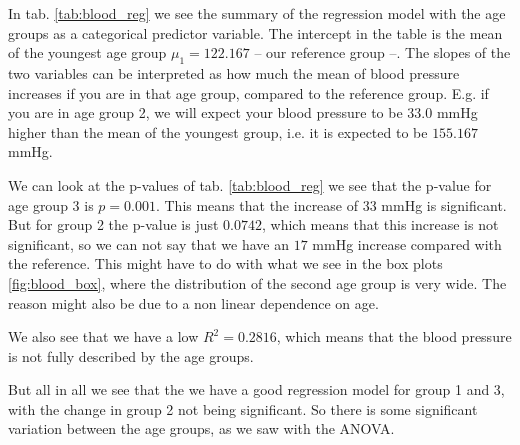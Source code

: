 \documentclass[a4paper,norsk, 10pt]{article}
\begin{document}
In tab. \ref{tab:blood_reg} we see the summary of the regression model with the age groups as a categorical predictor variable. The intercept in the table is the mean of the youngest age group $\mu_1 = 122.167$ --  our reference group --. The slopes of the two variables can be interpreted as how much the mean of blood pressure increases if you are in that age group, compared to the reference group. E.g. if you are in age group 2, we will expect your blood pressure to be $33.0$ mmHg higher than the mean of the youngest group, i.e. it is expected to be $155.167$ mmHg.

We can look at the p-values of tab. \ref{tab:blood_reg} we see that the p-value for age group 3 is $p=0.001$. This means that the increase of $33$ mmHg is significant. But for group 2 the p-value is just $0.0742$, which means that this increase is not significant, so we can not say that we have an $17$ mmHg increase compared  with the reference. This might have to do with what we see in the box plots \ref{fig:blood_box}, where the distribution of the second age group is very wide. The reason might also be due to a non linear dependence on age.

We also see that we have a low $R^2 = 0.2816$, which means that the blood pressure is not fully described by the age groups.

But all in all we see that the we have a good regression model for group 1 and 3, with the change in group 2 not being significant. So there is some significant variation between the age groups, as we saw with the ANOVA. 
\end{document}

